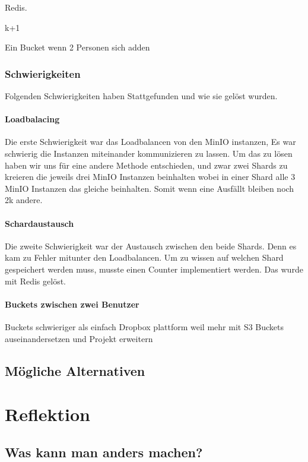 \documentclass[12pt]{report}
\begin{document}
			Redis.
			
			k+1 
			
			Ein Bucket wenn 2 Personen sich adden
			
			\subsection{Schwierigkeiten}
				Folgenden Schwierigkeiten haben Stattgefunden und wie sie gelöst wurden.
				
				\subsubsection{Loadbalacing}
					Die erste Schwierigkeit war das Loadbalancen von den MinIO instanzen, Es war schwierig die Instanzen miteinander kommunizieren zu lassen. Um das zu lösen haben wir uns für eine andere Methode entschieden, und zwar zwei Shards zu kreieren die jeweils drei MinIO Instanzen beinhalten wobei in einer Shard alle 3 MinIO Instanzen das gleiche beinhalten. Somit wenn eine Ausfällt bleiben noch 2k andere.
			
				\subsubsection{Schardaustausch}
					Die zweite Schwierigkeit war der Austausch zwischen den beide Shards. Denn es kam zu Fehler mitunter den Loadbalancen. Um zu wissen auf welchen Shard gespeichert werden muss, musste einen Counter implementiert werden. Das wurde mit Redis gelöst.
				
				\subsubsection{Buckets zwischen zwei Benutzer}
			Buckets schwieriger als einfach Dropbox plattform weil mehr mit S3 Buckets auseinandersetzen und Projekt erweitern
			
	\section{Mögliche Alternativen}
	
\chapter{Reflektion}
	\section{Was kann man anders machen?}
\end{document}
